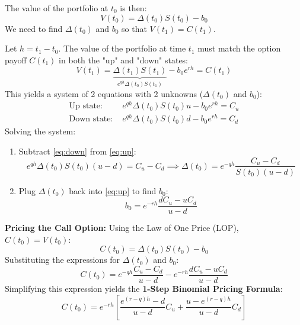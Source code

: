 The value of the portfolio at \(t_0\) is then:
\begin{equation*}
    V(t_0) = \Delta(t_0)S(t_0) - b_0
\end{equation*}
We need to find \(\Delta(t_0)\) and \(b_0\) so that \(V(t_1) = C(t_1)\).

Let \(h = t_1 - t_0\). The value of the portfolio at time \(t_1\) must match the option payoff \(C(t_1)\) in both the "up" and "down" states:
\begin{equation*}
    V(t_1) = \underbrace{\Delta(t_1)S(t_1)}_{e^{qh}\Delta(t_0)S(t_1)} - b_0 e^{rh} = C(t_1)
\end{equation*}
This yields a system of 2 equations with 2 unknowns (\(\Delta(t_0)\) and \(b_0\)):
\begin{align}
    \text{Up state: } & e^{qh}\Delta(t_0)S(t_0)u - b_0 e^{rh} = C_u \label{eq:up} \\
    \text{Down state: } & e^{qh}\Delta(t_0)S(t_0)d - b_0 e^{rh} = C_d \label{eq:down}
\end{align}
Solving the system:
\begin{enumerate}
    \item Subtract \eqref{eq:down} from \eqref{eq:up}:
    \begin{equation*}
        e^{qh}\Delta(t_0)S(t_0)(u-d) = C_u - C_d \implies \boxed{\Delta(t_0) = e^{-qh}\frac{C_u - C_d}{S(t_0)(u-d)}}
    \end{equation*}

    \item Plug \(\Delta(t_0)\) back into \eqref{eq:up} to find \(b_0\):
    \begin{equation*}
        b_0 = e^{-rh} \frac{dC_u - uC_d}{u-d}
    \end{equation*}
\end{enumerate}

\textbf{Pricing the Call Option:}
Using the Law of One Price (LOP), \(C(t_0) = V(t_0)\):
\begin{equation*}
    C(t_0) = \Delta(t_0)S(t_0) - b_0
\end{equation*}
Substituting the expressions for \(\Delta(t_0)\) and \(b_0\):
\begin{equation*}
    C(t_0) = e^{-qh}\frac{C_u - C_d}{u-d} - e^{-rh} \frac{dC_u - uC_d}{u-d}
\end{equation*}
Simplifying this expression yields the \textbf{1-Step Binomial Pricing Formula}:
\begin{equation*}
    \boxed{C(t_0) = e^{-rh} \left[ \frac{e^{(r-q)h} - d}{u-d}C_u + \frac{u - e^{(r-q)h}}{u-d}C_d \right]}
\end{equation*}

